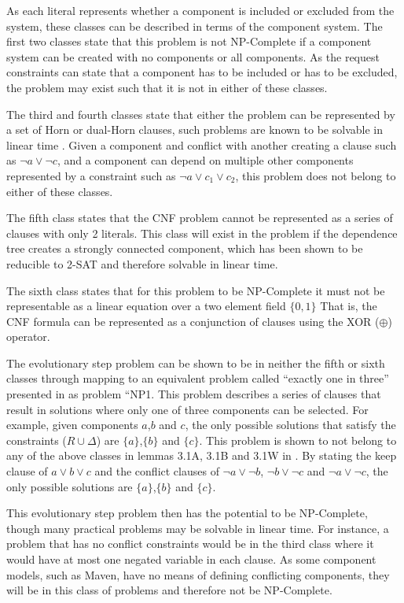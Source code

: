 As each literal represents whether a component is included or excluded from the system, these classes can be described in terms of the component system.
The first two classes state that this problem is not NP-Complete if a component system can be created with no components or all components.
As the request constraints can state that a component has to be included or has to be excluded, the problem may exist such that it is not in either of these classes.  

The third and fourth classes state that either the problem can be represented by a set of Horn or dual-Horn clauses, such problems are known to be solvable in linear time \cite{dowling1984linear}.
Given a component and conflict with another creating a clause such as $\neg a \vee \neg c$, and a component can depend on multiple other components represented by a constraint such as
$\neg a \vee c_1 \vee c_2$, this problem does not belong to either of these classes.

The fifth class states that the CNF problem cannot be represented as a series of clauses with only 2 literals.
This class will exist in the problem if the dependence tree creates a strongly connected component, which has been shown to be reducible to 2-SAT \cite{aspvall1979linear} and therefore solvable in linear time.

The sixth class states that for this problem to be NP-Complete it must not be representable as a linear equation over a two element field $\{0,1\}$
That is, the CNF formula can be represented as a conjunction of clauses using the XOR ($\oplus$) operator.
 
The evolutionary step problem can be shown to be in neither the fifth or sixth classes 
through mapping to an equivalent problem called ``exactly one in three'' presented in \cite{Schaefer1978} as problem ``NP1.
This problem describes a series of clauses that result in solutions where only one of three components can be selected. 
For example, given components $a$,$b$ and $c$, the only possible solutions that satisfy the constraints ($R \cup \Delta$) are $\{a\}$,$\{b\}$ and $\{c\}$.
This problem is shown to not belong to any of the above classes in lemmas 3.1A, 3.1B and 3.1W in \cite{Schaefer1978}.
By stating the keep clause of $a \vee b \vee c$ and the conflict clauses of $\neg a \vee \neg b$, $\neg b \vee \neg c$ and $\neg a \vee \neg c$, 
the only possible solutions are $\{a\}$,$\{b\}$ and $\{c\}$. 

This evolutionary step problem then has the potential to be NP-Complete, though many practical problems may be solvable in linear time.
For instance, a problem that has no conflict constraints would be in the third class where it would have at most one negated variable in each clause.
As some component models, such as Maven, have no means of defining conflicting components, they will be in this class of problems and therefore not be NP-Complete. 

